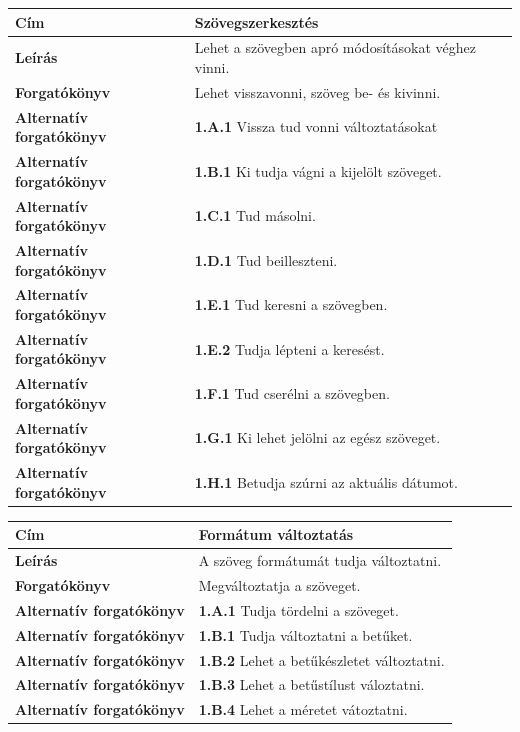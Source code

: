 \documentclass[12pt]{article}
\begin{document}
\begin{longtable}[h]{|p{5cm}|p{10cm}|}
  \hline
  \textbf{Cím} & \textbf{Szövegszerkesztés} \\ \hline
  \textbf{Leírás} & Lehet a szövegben apró módosításokat véghez vinni.\\ \hline
  \textbf{Forgatókönyv} & Lehet visszavonni, szöveg be- és kivinni.\\ \hline
  \textbf{Alternatív forgatókönyv} & \textbf{1.A.1} Vissza tud vonni változtatásokat \\ \hline
  \textbf{Alternatív forgatókönyv} & \textbf{1.B.1} Ki tudja vágni a kijelölt
  szöveget. \\ \hline
  \textbf{Alternatív forgatókönyv} & \textbf{1.C.1} Tud másolni. \\ \hline
  \textbf{Alternatív forgatókönyv} & \textbf{1.D.1} Tud beilleszteni. \\ \hline
  \textbf{Alternatív forgatókönyv} & \textbf{1.E.1} Tud keresni a szövegben. \\ \hline
  \textbf{Alternatív forgatókönyv} & \textbf{1.E.2} Tudja lépteni a keresést. \\ \hline
  \textbf{Alternatív forgatókönyv} & \textbf{1.F.1} Tud cserélni a szövegben. \\ \hline
  \textbf{Alternatív forgatókönyv} & \textbf{1.G.1} Ki lehet jelölni az egész szöveget. \\ \hline
  \textbf{Alternatív forgatókönyv} & \textbf{1.H.1} Betudja szúrni az aktuális dátumot. \\ \hline
\end{longtable}

\begin{longtable}[h]{|p{5cm}|p{10cm}|}
  \hline
  \textbf{Cím} & \textbf{Formátum változtatás} \\ \hline
  \textbf{Leírás} & A szöveg formátumát tudja változtatni. \\ \hline
  \textbf{Forgatókönyv} & Megváltoztatja a szöveget. \\ \hline
  \textbf{Alternatív forgatókönyv} & \textbf{1.A.1} Tudja tördelni a szöveget. \\ \hline
  \textbf{Alternatív forgatókönyv} & \textbf{1.B.1} Tudja változtatni a betűket. \\ \hline
  \textbf{Alternatív forgatókönyv} & \textbf{1.B.2} Lehet a betűkészletet változtatni. \\ \hline
  \textbf{Alternatív forgatókönyv} & \textbf{1.B.3} Lehet a betűstílust váloztatni. \\ \hline
  \textbf{Alternatív forgatókönyv} & \textbf{1.B.4} Lehet a méretet vátoztatni. \\ \hline
\end{longtable}
\end{document}
